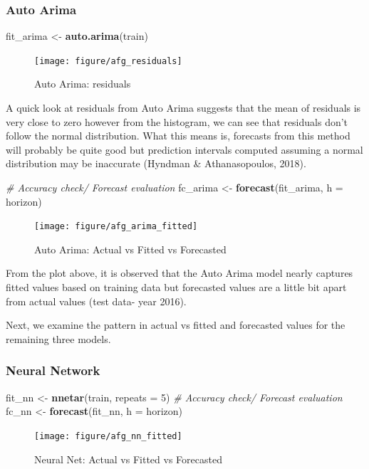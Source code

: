 \documentclass[11pt,oneside,a4paper]{reedthesis}
\newenvironment{Shaded}{\begin{snugshade}}{\end{snugshade}}
\newcommand{\KeywordTok}[1]{\textcolor[rgb]{0.13,0.29,0.53}{\textbf{#1}}}
\newcommand{\DataTypeTok}[1]{\textcolor[rgb]{0.13,0.29,0.53}{#1}}
\newcommand{\DecValTok}[1]{\textcolor[rgb]{0.00,0.00,0.81}{#1}}
\newcommand{\StringTok}[1]{\textcolor[rgb]{0.31,0.60,0.02}{#1}}
\newcommand{\CommentTok}[1]{\textcolor[rgb]{0.56,0.35,0.01}{\textit{#1}}}
\newcommand{\NormalTok}[1]{#1}
\begin{document}
\subsubsection{Auto Arima}\label{auto-arima}
\begin{Shaded}
\begin{Highlighting}[]
\NormalTok{fit_arima <-}\StringTok{ }\KeywordTok{auto.arima}\NormalTok{(train)}
\end{Highlighting}
\end{Shaded}
\begin{figure}
\texttt{[image: figure/afg\_residuals]} \caption{Auto Arima: residuals}\label{fig:unnamed-chunk-62}
\end{figure}
A quick look at residuals from Auto Arima suggests that the mean of
residuals is very close to zero however from the histogram, we can see
that residuals don't follow the normal distribution. What this means is,
forecasts from this method will probably be quite good but prediction
intervals computed assuming a normal distribution may be inaccurate
(Hyndman \& Athanasopoulos, 2018).
\begin{Shaded}
\begin{Highlighting}[]
\CommentTok{# Accuracy check/ Forecast evaluation}
\NormalTok{fc_arima <-}\StringTok{ }\KeywordTok{forecast}\NormalTok{(fit_arima, }\DataTypeTok{h =}\NormalTok{ horizon)}
\end{Highlighting}
\end{Shaded}
\begin{figure}
\texttt{[image: figure/afg\_arima\_fitted]} \caption{Auto Arima: Actual vs Fitted vs Forecasted}\label{fig:unnamed-chunk-64}
\end{figure}
From the plot above, it is observed that the Auto Arima model nearly
captures fitted values based on training data but forecasted values are
a little bit apart from actual values (test data- year 2016).

Next, we examine the pattern in actual vs fitted and forecasted values
for the remaining three models.

\subsubsection{Neural Network}\label{neural-network}
\begin{Shaded}
\begin{Highlighting}[]
\NormalTok{fit_nn <-}\StringTok{ }\KeywordTok{nnetar}\NormalTok{(train, }\DataTypeTok{repeats =} \DecValTok{5}\NormalTok{)}
\CommentTok{# Accuracy check/ Forecast evaluation }
\NormalTok{fc_nn <-}\StringTok{ }\KeywordTok{forecast}\NormalTok{(fit_nn, }\DataTypeTok{h =}\NormalTok{ horizon)}
\end{Highlighting}
\end{Shaded}
\begin{figure}
\texttt{[image: figure/afg\_nn\_fitted]} \caption{Neural Net: Actual vs Fitted vs Forecasted}\label{fig:unnamed-chunk-66}
\end{figure}
\vspace{18pt}
\end{document}
